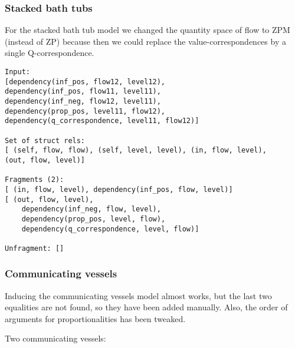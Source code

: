 \documentclass{article}
\begin{document}
\subsubsection{Stacked bath tubs}

For the stacked bath tub model we changed the quantity space of flow to ZPM
(instead of ZP) because then we could replace the value-correspondences by a
single Q-correspondence.

\begin{verbatim}
Input: 
[dependency(inf_pos, flow12, level12), 
dependency(inf_pos, flow11, level11), 
dependency(inf_neg, flow12, level11), 
dependency(prop_pos, level11, flow12), 
dependency(q_correspondence, level11, flow12)]

Set of struct rels: 
[ (self, flow, flow), (self, level, level), (in, flow, level), 
(out, flow, level)]

Fragments (2): 
[ (in, flow, level), dependency(inf_pos, flow, level)]
[ (out, flow, level), 
	dependency(inf_neg, flow, level), 
	dependency(prop_pos, level, flow), 
	dependency(q_correspondence, level, flow)]

Unfragment: []
\end{verbatim}

\subsubsection{Communicating vessels} 
Inducing the communicating vessels model almost works, but the last two
equalities are not found, so they have been added manually. Also, the order of
arguments for proportionalities has been tweaked. 

Two communicating vessels:
\end{document}
